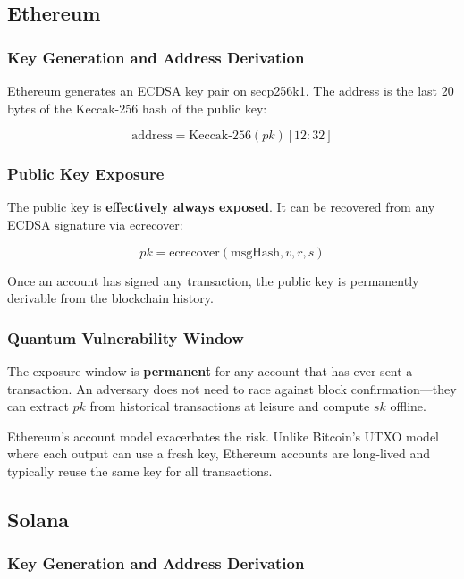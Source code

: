 \subsection{Ethereum}

\subsubsection{Key Generation and Address Derivation}

Ethereum generates an ECDSA key pair on secp256k1. The address is
the last 20 bytes of the Keccak-256 hash of the public key:

\[
\text{address} = \text{Keccak-256}(pk)[12{:}32]
\]

\subsubsection{Public Key Exposure}

The public key is \textbf{effectively always exposed}. It can be
recovered from any ECDSA signature via ecrecover:

\[
pk = \text{ecrecover}(\text{msgHash}, v, r, s)
\]

Once an account has signed any transaction, the public key is
permanently derivable from the blockchain history.

\subsubsection{Quantum Vulnerability Window}

The exposure window is \textbf{permanent} for any account that has
ever sent a transaction. An adversary does not need to race against
block confirmation---they can extract $pk$ from historical transactions
at leisure and compute $sk$ offline.

\begin{remark}
Ethereum's account model exacerbates the risk. Unlike Bitcoin's UTXO
model where each output can use a fresh key, Ethereum accounts are
long-lived and typically reuse the same key for all transactions.
\end{remark}

\subsection{Solana}

\subsubsection{Key Generation and Address Derivation}

